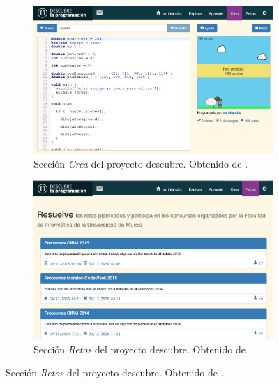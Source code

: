 \begin{figure}[!ht]
	\begin{adjustwidth}{\oddsidemargin-1in}{\rightmargin}
			\begin{subfigure}{\paperwidth}
				\centering
				\includegraphics[scale=.35]{images/descubre-crea.png}
				\caption{Sección \emph{Crea} del proyecto \Gls{descubre}. Obtenido de \cite{descubre}.}
				\label{fig:descubre-crea}
			\end{subfigure}
			\begin{subfigure}{\paperwidth}
				\centering
				\includegraphics[scale=.35]{images/descubre-retos.png}
				\caption{Sección \emph{Retos} del proyecto \Gls{descubre}. Obtenido de \cite{descubre}.}
				\label{fig:descubre-retos}
			\end{subfigure}
		\label{fig:decubre-crea-retos}
	\end{adjustwidth}
\end{figure}

